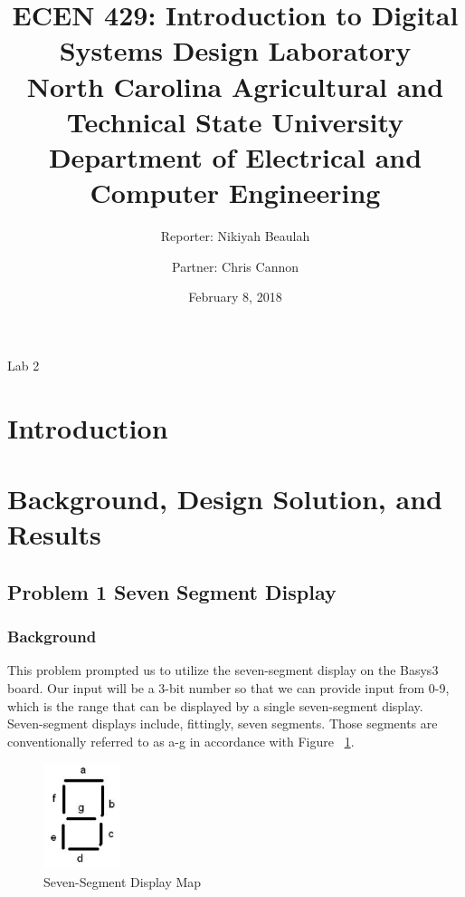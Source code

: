 \documentclass[11pt]{article}
\title {ECEN 429: Introduction to Digital Systems Design Laboratory \\ North Carolina Agricultural and Technical State University \\ Department of Electrical and Computer Engineering} %
\author{Reporter: Nikiyah Beaulah\\ \and Partner: Chris Cannon} %
\date{February 8, 2018}
\begin{document}
\maketitle %

\begin{center}
Lab	2
\end{center}

\pagebreak

\section{Introduction}

\section{Background, Design Solution, and Results}

\subsection{Problem 1 Seven Segment Display}

\subsubsection{Background}
This problem prompted us to utilize the seven-segment display on the Basys3 board. Our input will be a 3-bit number so that we can provide input from 0-9, which is the range that can be displayed by a single seven-segment display. Seven-segment displays include, fittingly, seven segments. Those segments are conventionally referred to as a-g in accordance with Figure ~\ref{fig:sevenSegMap}.

\begin{figure}[h]
\begin{center}
\includegraphics[width=0.2\textwidth]{report-images/img1.png}
\caption{Seven-Segment Display Map}
\label{fig:sevenSegMap}
\end{center}
\end{figure}
\end{document}
